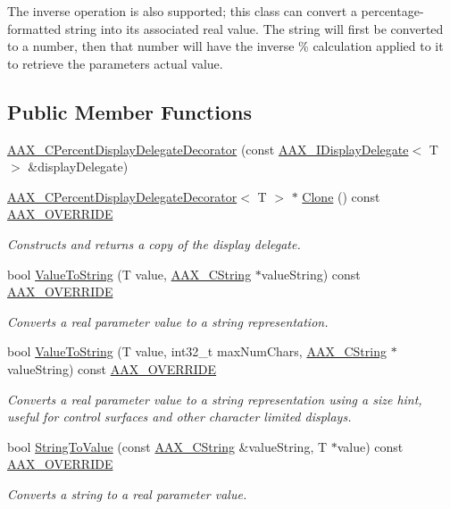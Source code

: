 The inverse operation is also supported; this class can convert a percentage-\/formatted string into its associated real value. The string will first be converted to a number, then that number will have the inverse \% calculation applied to it to retrieve the parameter\textquotesingle{}s actual value. \subsection*{Public Member Functions}
\begin{DoxyCompactItemize}
\item 
\mbox{\hyperlink{a01549_ab1a468a7025667b8cecbf2fc6f4f7d21}{A\+A\+X\+\_\+\+C\+Percent\+Display\+Delegate\+Decorator}} (const \mbox{\hyperlink{a01801}{A\+A\+X\+\_\+\+I\+Display\+Delegate}}$<$ T $>$ \&display\+Delegate)
\item 
\mbox{\hyperlink{a01549}{A\+A\+X\+\_\+\+C\+Percent\+Display\+Delegate\+Decorator}}$<$ T $>$ $\ast$ \mbox{\hyperlink{a01549_affe52efa34c969895f75b067e875dafb}{Clone}} () const \mbox{\hyperlink{a00392_ac2f24a5172689ae684344abdcce55463}{A\+A\+X\+\_\+\+O\+V\+E\+R\+R\+I\+DE}}
\begin{DoxyCompactList}\small\item\em Constructs and returns a copy of the display delegate. \end{DoxyCompactList}\item 
bool \mbox{\hyperlink{a01549_a06407f0b1287891bf658bc4e4166e2e4}{Value\+To\+String}} (T value, \mbox{\hyperlink{a01573}{A\+A\+X\+\_\+\+C\+String}} $\ast$value\+String) const \mbox{\hyperlink{a00392_ac2f24a5172689ae684344abdcce55463}{A\+A\+X\+\_\+\+O\+V\+E\+R\+R\+I\+DE}}
\begin{DoxyCompactList}\small\item\em Converts a real parameter value to a string representation. \end{DoxyCompactList}\item 
bool \mbox{\hyperlink{a01549_a80f4b7189ac37a15550e9f1846fcbfd7}{Value\+To\+String}} (T value, int32\+\_\+t max\+Num\+Chars, \mbox{\hyperlink{a01573}{A\+A\+X\+\_\+\+C\+String}} $\ast$value\+String) const \mbox{\hyperlink{a00392_ac2f24a5172689ae684344abdcce55463}{A\+A\+X\+\_\+\+O\+V\+E\+R\+R\+I\+DE}}
\begin{DoxyCompactList}\small\item\em Converts a real parameter value to a string representation using a size hint, useful for control surfaces and other character limited displays. \end{DoxyCompactList}\item 
bool \mbox{\hyperlink{a01549_a702a4dea21a72dc8edf6b91b5a5bf5e5}{String\+To\+Value}} (const \mbox{\hyperlink{a01573}{A\+A\+X\+\_\+\+C\+String}} \&value\+String, T $\ast$value) const \mbox{\hyperlink{a00392_ac2f24a5172689ae684344abdcce55463}{A\+A\+X\+\_\+\+O\+V\+E\+R\+R\+I\+DE}}
\begin{DoxyCompactList}\small\item\em Converts a string to a real parameter value. \end{DoxyCompactList}\end{DoxyCompactItemize}


